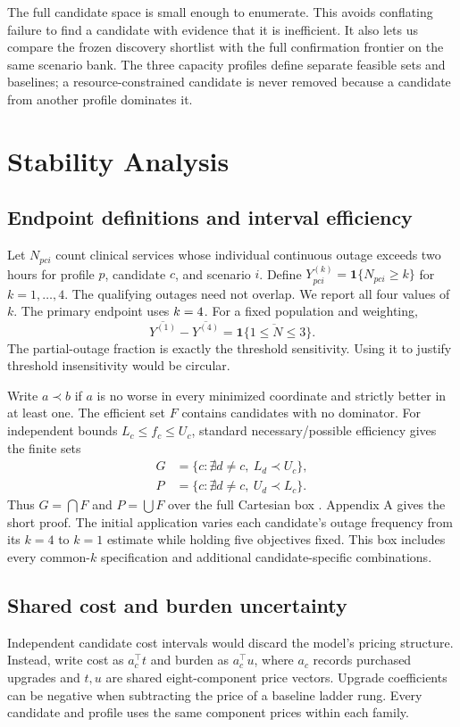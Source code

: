 \documentclass[conference,compsoc]{IEEEtran}
\begin{document}
The full candidate space is small enough to enumerate. This avoids conflating
failure to find a candidate with evidence that it is inefficient. It also lets
us compare the frozen discovery shortlist with the full confirmation frontier
on the same scenario bank. The three capacity profiles define separate
feasible sets and baselines; a resource-constrained candidate is never removed
because a candidate from another profile dominates it.

\section{Stability Analysis}
\subsection{Endpoint definitions and interval efficiency}
Let $N_{pci}$ count clinical services whose individual continuous outage
exceeds two hours for profile $p$, candidate $c$, and scenario $i$.
Define $Y^{(k)}_{pci}=\mathbf{1}\{N_{pci}\geq k\}$ for $k=1,\ldots,4$.
The qualifying outages need not overlap. We report all four values of $k$. The primary endpoint uses
$k=4$. For a fixed population and weighting,
\begin{equation}
 \overline{Y^{(1)}}-\overline{Y^{(4)}}
 =\overline{\mathbf{1}\{1\leq N\leq3\}}. \label{eq:identity}
\end{equation}
The partial-outage fraction is exactly the threshold sensitivity.
Using it to justify threshold insensitivity would be circular.

Write $a\prec b$ if $a$ is no worse in every minimized coordinate and
strictly better in at least one. The efficient set $F$ contains candidates
with no dominator. For independent bounds $L_c\leq f_c\leq U_c$, standard
necessary/possible efficiency gives the finite sets
\begin{align}
 G&=\{c:\nexists d\ne c,\ L_d\prec U_c\}, \label{eq:guaranteed}\\
 P&=\{c:\nexists d\ne c,\ U_d\prec L_c\}. \label{eq:possible}
\end{align}
Thus $G=\bigcap F$ and $P=\bigcup F$ over the full Cartesian box
\cite{hladik2017}. Appendix A gives the short proof. The initial application
varies each candidate's outage frequency from its $k=4$ to $k=1$ estimate
while holding five objectives fixed. This box includes every common-$k$
specification and additional candidate-specific combinations.

\subsection{Shared cost and burden uncertainty}
Independent candidate cost intervals would discard the model's pricing
structure. Instead, write cost as $a_c^\top t$ and burden as $a_c^\top u$,
where $a_c$ records purchased upgrades and $t,u$ are shared eight-component
price vectors. Upgrade coefficients can be negative when subtracting the
price of a baseline ladder rung. Every candidate and profile uses the same
component prices within each family.
\end{document}
